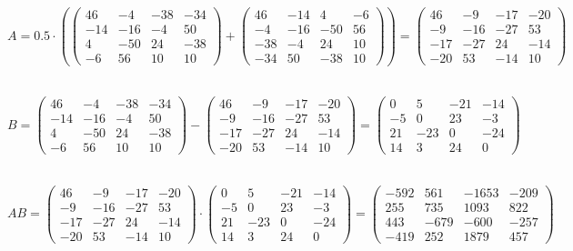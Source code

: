 \documentclass[a4paper, 12pt]{article}
\begin{document}
    \\
    \\
    \par $A = 0.5 \cdot (\begin{pmatrix}46 & -4 & -38 & -34\\ -14 & -16 & -4 & 50\\ 4 & -50 & 24 & -38 \\ -6 & 56 & 10 & 10\end{pmatrix} + \begin{pmatrix}46 & -14 & 4 & -6\\-4 & -16 & -50 & 56\\-38 & -4 & 24 & 10\\-34 & 50 & -38 & 10\end{pmatrix}) = \begin{pmatrix}46 & -9 & -17 & -20\\-9 & -16 & -27 & 53\\-17 & -27 & 24 & -14\\-20 & 53 & -14 & 10\end{pmatrix}$
    \\
    \\
    \par $B = \begin{pmatrix}46 & -4 & -38 & -34\\ -14 & -16 & -4 & 50\\ 4 & -50 & 24 & -38 \\ -6 & 56 & 10 & 10\end{pmatrix} - \begin{pmatrix}46 & -9 & -17 & -20\\-9 & -16 & -27 & 53\\-17 & -27 & 24 & -14\\-20 & 53 & -14 & 10\end{pmatrix} = \begin{pmatrix}0 & 5 & -21 & -14\\-5 & 0 & 23 & -3\\21 & -23 & 0 & -24\\14 & 3 & 24 & 0\end{pmatrix}$
    \\
    \\
    \par $AB = \begin{pmatrix}46 & -9 & -17 & -20\\-9 & -16 & -27 & 53\\-17 & -27 & 24 & -14\\-20 & 53 & -14 & 10\end{pmatrix} \cdot \begin{pmatrix}0 & 5 & -21 & -14\\-5 & 0 & 23 & -3\\21 & -23 & 0 & -24\\14 & 3 & 24 & 0\end{pmatrix} = \begin{pmatrix}-592 & 561 & -1653 & -209\\255 & 735 & 1093 & 822\\443 & -679 & -600 & -257\\-419 & 252 & 1879 & 457\end{pmatrix}$
\end{document}
